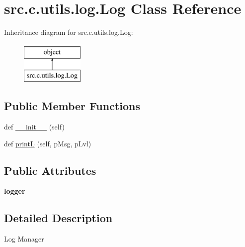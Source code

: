 \hypertarget{classsrc_1_1c_1_1utils_1_1log_1_1_log}{}\section{src.\+c.\+utils.\+log.\+Log Class Reference}
\label{classsrc_1_1c_1_1utils_1_1log_1_1_log}
Inheritance diagram for src.\+c.\+utils.\+log.\+Log\+:\begin{figure}[H]
\begin{center}
\leavevmode
\includegraphics[height=2.000000cm]{classsrc_1_1c_1_1utils_1_1log_1_1_log}
\end{center}
\end{figure}
\subsection*{Public Member Functions}
\begin{DoxyCompactItemize}
\item 
def \hyperlink{classsrc_1_1c_1_1utils_1_1log_1_1_log_a532c0eb78a42573ac16794eaac1bf132}{\+\_\+\+\_\+init\+\_\+\+\_\+} (self)
\item 
def \hyperlink{classsrc_1_1c_1_1utils_1_1log_1_1_log_a79cc8dd1b6ef07d44dfd8db748e21e10}{print\+L} (self, p\+Msg, p\+Lvl)
\end{DoxyCompactItemize}
\subsection*{Public Attributes}
\begin{DoxyCompactItemize}
\item 
\hypertarget{classsrc_1_1c_1_1utils_1_1log_1_1_log_a14e778a1831ac635f42e7169cbcec309}{}{\bfseries logger}\label{classsrc_1_1c_1_1utils_1_1log_1_1_log_a14e778a1831ac635f42e7169cbcec309}

\end{DoxyCompactItemize}


\subsection{Detailed Description}
\begin{DoxyVerb}Log Manager
\end{DoxyVerb}
 

